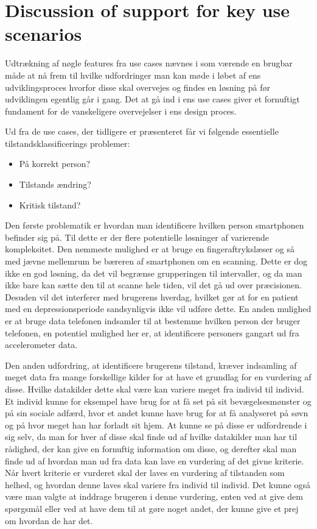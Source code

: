 \section{Discussion of support for key use scenarios}
Udtrækning af nøgle features fra use cases nævnes i \citep[Afsnit 14.4, s94]{art:essence} som værende en brugbar måde at nå frem til hvilke udfordringer man kan møde i løbet af ens udviklingsproces hvorfor disse skal overvejes og findes en løsning på før udviklingen egentlig går i gang.
Det at gå ind i ens use cases giver et fornuftigt fundament for de vanskeligere overvejelser i ens design proces.

Ud fra de use cases, der tidligere er præsenteret får vi følgende essentielle tilstandsklassificerings problemer:
\begin{itemize}
\item På korrekt person?
\item Tilstands ændring?
\item Kritisk tilstand?
\end{itemize}

Den første problematik er hvordan man identificere hvilken person smartphonen befinder sig på.
Til dette er der flere potentielle løsninger af varierende kompleksitet.
Den nemmeste mulighed er at bruge en fingeraftrykslæser og så med jævne mellemrum be bæreren af smartphonen om en scanning.
Dette er dog ikke en god løsning, da det vil begrænse grupperingen til intervaller, og da man ikke bare kan sætte den til at scanne hele tiden, vil det gå ud over præcisionen.
Desuden vil det interferer med brugerens hverdag, hvilket gør at for en patient med en depressionsperiode sandsynligvis ikke vil udføre dette.
En anden mulighed er at bruge data telefonen indsamler til at bestemme hvilken person der bruger telefonen, en potentiel mulighed her er, at identificere personers gangart ud fra accelerometer data.

Den anden udfordring, at identificere brugerens tilstand, kræver indsamling af meget data fra mange forskellige kilder for at have et grundlag for en vurdering af disse.
Hvilke datakilder dette skal være kan variere meget fra individ til individ.
Et individ kunne for eksempel have brug for at få set på sit bevægelsesmønster og på sin sociale adfærd, hvor et andet kunne have brug for at få analyseret på søvn og på hvor meget han har forladt sit hjem.
At kunne se på disse er udfordrende i sig selv, da man for hver af disse skal finde ud af hvilke datakilder man har til rådighed, der kan give en fornuftig information om disse, og derefter skal man finde ud af hvordan man ud fra data kan lave en vurdering af det givne kriterie.
Når hvert kriterie er vurderet skal der laves en vurdering af tilstanden som helhed, og hvordan denne laves skal variere fra individ til individ.
Det kunne også være man valgte at inddrage brugeren i denne vurdering, enten ved at give dem spørgsmål eller ved at have dem til at gøre noget andet, der kunne give et prej om hvordan de har det.

